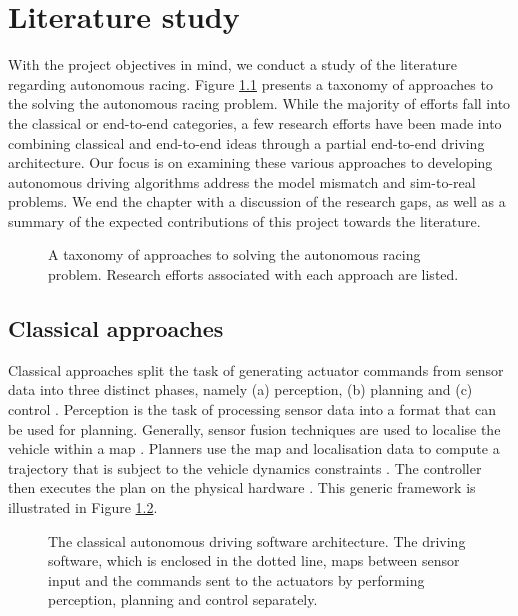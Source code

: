 \chapter{Literature study}
\label{chp:litreview}

With the project objectives in mind, we conduct a study of the literature regarding autonomous racing.
Figure \ref{fig:lit_tax_sec} presents a taxonomy of approaches to the solving the autonomous racing problem.
While the majority of efforts fall into the classical or end-to-end categories, a few research efforts have been made into combining classical and end-to-end ideas through a partial end-to-end driving architecture.
Our focus is on examining these various approaches to developing autonomous driving algorithms address the model mismatch and sim-to-real problems.
We end the chapter with a discussion of the research gaps, as well as a summary of the expected contributions of this project towards the literature.

\begin{figure}[htb!]
    \centering
    
    \caption[A taxonomy of the autonomous racing literature]{A taxonomy of approaches to solving the autonomous racing problem. Research efforts associated with each approach are listed.}
    \label{fig:lit_tax_sec}
\end{figure}


\section{Classical approaches}\label{sec:classic}


Classical approaches split the task of generating actuator commands from sensor data into three distinct phases, namely (a) perception, (b) planning and (c) control \cite{Betz2021}.
Perception is the task of processing sensor data into a format that can be used for planning. 
Generally, sensor fusion techniques are used to localise the vehicle within a map \cite{Gotlib2019, Wischnewski2019}.
Planners use the map and localisation data to compute a trajectory that is subject to the vehicle dynamics constraints \cite{Liniger2015a}.
The controller then executes the plan on the physical hardware \cite{Kritayakirana2012}.
This generic framework is illustrated in Figure \ref{fig:full_stack}.

\begin{figure}[h]
    \centering
    
    \caption[The classical autonomous driving architecture]{The classical autonomous driving software architecture. The driving software, which is enclosed in the dotted line, maps between sensor input and the commands sent to the actuators by performing perception, planning and control separately.}
    \label{fig:full_stack}
\end{figure}

